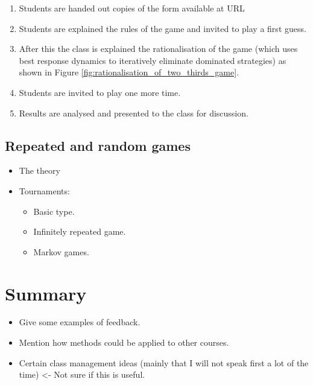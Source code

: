 \documentclass{article}
\begin{document}
\begin{enumerate}
    \item Students are handed out copies of the form available at URL
    \item Students are explained the rules of the game and invited to play a
        first guess.
    \item After this the class is explained the rationalisation of the game
        (which uses best response dynamics to iteratively eliminate dominated
        strategies) as shown in Figure
        \ref{fig:rationalisation_of_two_thirds_game}.
    \item Students are invited to play one more time.
    \item Results are analysed and presented to the class for discussion.
\end{enumerate}

\subsection{Repeated and random games}\label{sec:repeated_games}

\begin{itemize}
    \item The theory
    \item Tournaments:
        \begin{itemize}
            \item Basic type.
            \item Infinitely repeated game.
            \item Markov games.
        \end{itemize}
\end{itemize}

\section{Summary}

\begin{itemize}
    \item Give some examples of feedback.
    \item Mention how methods could be applied to other courses.
    \item Certain class management ideas (mainly that I will not speak first a
        lot of the time) <- Not sure if this is useful.
\end{itemize}

\printbibliography
\end{document}
